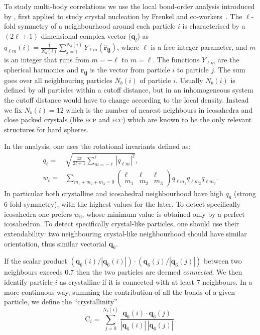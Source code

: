 \documentclass[twocolumn,superscriptaddress]{revtex4-1}
\begin{document}
To study multi-body correlations we use the local bond-order analysis introduced by
\citet{steinhardt}, first applied to study crystal nucleation by
Frenkel and co-workers~\cite{auer}. 
The $\ell$-fold symmetry of a neighbourhood around each particle $i$ is characterised by a $(2\ell+1)$ dimensional complex vector ($\mathbf{q}_l$) as $q_{\ell m}(i)=\frac{1}{N_b(i)}\sum_{j=1}^{N_b(i)} Y_{\ell m}(\mathbf{\hat{r}_{ij}})$, where
$\ell$ is a free integer parameter, and $m$ is an integer
that runs from $m=-\ell$ to $m=\ell$. The functions $Y_{\ell m}$ are the spherical harmonics
and $\mathbf{\hat{r}_{ij}}$ is the vector from particle $i$ to particle $j$.
The sum goes over all neighbouring particles $N_b(i)$ of particle $i$. Usually 
$N_b(i)$ is defined by all particles within a cutoff distance, but in an inhomogeneous system
the cutoff distance would have to change according to the local density. Instead we 
fix $N_b(i)=12$ which is the number of nearest neighbours in icosahedra and close packed crystals (like \textsc{hcp} and \textsc{fcc})
which are known to be the only relevant structures for hard spheres.

In the analysis, one uses the rotational invariants defined as:
\begin{align}
	q_\ell =& \sqrt{\frac{4\pi}{2l+1} \sum_{m=-\ell}^{\ell} |q_{\ell m}|^2 }, \label{eq:ql}\\
	w_\ell =& \sum_{m_1+m_2+m_3=0} 
			\left( \begin{array}{ccc}
				\ell & \ell & \ell \\
				m_1 & m_2 & m_3 
			\end{array} \right)
			q_{\ell m_1} q_{\ell m_2} q_{\ell m_3}. \label{eq:wl}
\end{align}
In particular both crystalline and icosahedral neighbourhood have high $q_6$ (strong 6-fold symmetry), with the highest values for the later. To detect specifically icosahedra one prefers $w_6$, whose minimum value is obtained only by a perfect icosahedron. To detect specifically crystal-like particles, one should use their extendability: two neighbouring crystal-like neighbourhood should have similar orientation, thus similar vectorial $\mathbf{q}_6$.

If the scalar product $(\mathbf{q}_6(i)/|\mathbf{q}_6(i)|)\cdot(\mathbf{q}_6(j)/|\mathbf{q}_6(j)|)$ between
two neighbours exceeds $0.7$ then the two particles are deemed \emph{connected}. We then identify particle $i$ as crystalline if it is connected with at least $7$ neighbours. In a more continuous way, summing the contribution of all the bonds of a given particle, we define the ``crystallinity''~\cite{russo_hs}
\begin{equation}\label{eqn:crystallinity}
 \text{C}_i=\sum_{j=0}^{N_b(i)}\frac{\mathbf{q}_6(i)\cdot\mathbf{q}_6(j)}{|\mathbf{q}_6(i)|\,|\mathbf{q}_6(j)|}.
\end{equation}
\end{document}
